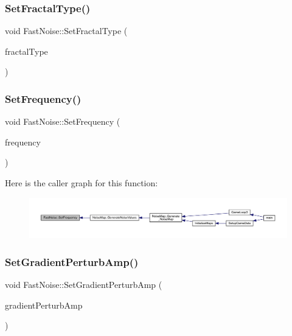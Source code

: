 \subsubsection{\texorpdfstring{Set\+Fractal\+Type()}{SetFractalType()}}
{\footnotesize\ttfamily void Fast\+Noise\+::\+Set\+Fractal\+Type (\begin{DoxyParamCaption}\item[{\mbox{\hyperlink{class_fast_noise_a20a2d45a468fa10a7c6a94e22c2f3d30}{Fractal\+Type}}}]{fractal\+Type }\end{DoxyParamCaption})\hspace{0.3cm}{\ttfamily [inline]}}

\mbox{\label{class_fast_noise_a4a16af07f18788c25e7515a9e1d2c53c}} 
\subsubsection{\texorpdfstring{Set\+Frequency()}{SetFrequency()}}
{\footnotesize\ttfamily void Fast\+Noise\+::\+Set\+Frequency (\begin{DoxyParamCaption}\item[{\mbox{\hyperlink{_fast_noise_8h_a75a9ef6d2541c4921815b885bfd449c3}{F\+N\+\_\+\+D\+E\+C\+I\+M\+AL}}}]{frequency }\end{DoxyParamCaption})\hspace{0.3cm}{\ttfamily [inline]}}

Here is the caller graph for this function\+:
\nopagebreak
\begin{figure}[H]
\begin{center}
\leavevmode
\includegraphics[width=350pt]{d1/dd8/class_fast_noise_a4a16af07f18788c25e7515a9e1d2c53c_icgraph}
\end{center}
\end{figure}
\mbox{\label{class_fast_noise_a3b64dacf76e2a0f61769d51c73e9fdb3}} 
\subsubsection{\texorpdfstring{Set\+Gradient\+Perturb\+Amp()}{SetGradientPerturbAmp()}}
{\footnotesize\ttfamily void Fast\+Noise\+::\+Set\+Gradient\+Perturb\+Amp (\begin{DoxyParamCaption}\item[{\mbox{\hyperlink{_fast_noise_8h_a75a9ef6d2541c4921815b885bfd449c3}{F\+N\+\_\+\+D\+E\+C\+I\+M\+AL}}}]{gradient\+Perturb\+Amp }\end{DoxyParamCaption})\hspace{0.3cm}{\ttfamily [inline]}}

